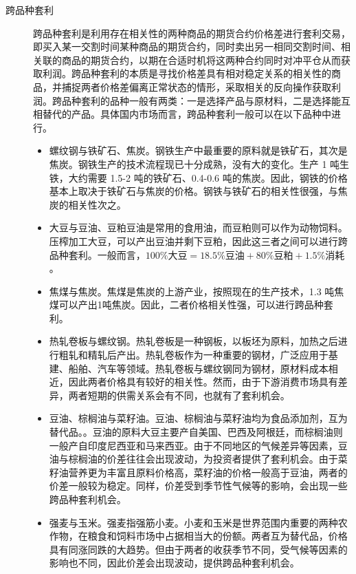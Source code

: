 \begin{description}
    \item[跨品种套利] 跨品种套利是利用存在相关性的两种商品的期货合约价格差进行套利交易，即买入某一交割时间某种商品的期货合约，同时卖出另一相同交割时间、相关联的商品的期货合约，以期在合适时机将这两种合约同时对冲平仓从而获取利润。跨品种套利的本质是寻找价格差具有相对稳定关系的相关性的商品，并捕捉两者价格差偏离正常状态的情形，采取相关的反向操作获取利润。跨品种套利的品种一般有两类：一是选择产品与原材料，二是选择能互相替代的产品。具体国内市场而言，跨品种套利一般可以在以下品种中进行。
        \begin{itemize}
            \item 螺纹钢与铁矿石、焦炭。钢铁生产中最重要的原料就是铁矿石，其次是焦炭。钢铁生产的技术流程现已十分成熟，没有大的变化。生产 1 吨生铁，大约需要 1.5-2 吨的铁矿石、0.4-0.6 吨的焦炭。因此，钢铁的价格基本上取决于铁矿石与焦炭的价格。钢铁与铁矿石的相关性很强，与焦炭的相关性次之。
            \item 大豆与豆油、豆粕豆油是常用的食用油，而豆粕则可以作为动物饲料。压榨加工大豆，可以产出豆油并剩下豆粕，因此这三者之间可以进行跨品种套利。一般而言，$100\% \text{大豆}=18.5\% \text{豆油}+80\% \text{豆粕}+1.5\% \text{消耗}$。
            \item 焦煤与焦炭。焦煤是焦炭的上游产业，按照现在的生产技术，1.3 吨焦煤可以产出1吨焦炭。因此，二者价格相关性强，可以进行跨品种套利。
            \item 热轧卷板与螺纹钢。热轧卷板是一种钢板，以板坯为原料，加热之后进行粗轧和精轧后产出。热轧卷板作为一种重要的钢材，广泛应用于基建、船舶、汽车等领域。热轧卷板与螺纹钢同为钢材，原材料成本相近，因此两者价格具有较好的相关性。然而，由于下游消费市场具有差异，两者短期的供需关系会有不同，也就有了套利机会。
            \item 豆油、棕榈油与菜籽油。豆油、棕榈油与菜籽油均为食品添加剂，互为替代品。。豆油的原料大豆主要产自美国、巴西及阿根廷，而棕榈油则一般产自印度尼西亚和马来西亚。由于不同地区的气候差异等因素，豆油与棕榈油的价差往往会出现波动，为投资者提供了套利机会。由于菜籽油营养更为丰富且原料价格高，菜籽油的价格一般高于豆油，两者的价差一般较为稳定。同样，价差受到季节性气候等的影响，会出现一些跨品种套利机会。
            \item 强麦与玉米。强麦指强筋小麦。小麦和玉米是世界范围内重要的两种农作物，在粮食和饲料市场中占据相当大的份额。两者互为替代品，价格具有同涨同跌的大趋势。但由于两者的收获季节不同，受气候等因素的影响也不同，因此价差会出现波动，提供跨品种套利机会。

\end{itemize}
\end{description}
